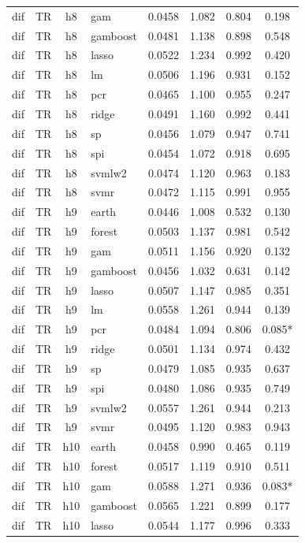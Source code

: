 \begin{ThreePartTable}
\begin{longtable}[t]{llclcccc}
dif & TR & h8 & gam & 0.0458 & 1.082 & 0.804 & 0.198\\
dif & TR & h8 & gamboost & 0.0481 & 1.138 & 0.898 & 0.548\\
dif & TR & h8 & lasso & 0.0522 & 1.234 & 0.992 & 0.420\\
dif & TR & h8 & lm & 0.0506 & 1.196 & 0.931 & 0.152\\
dif & TR & h8 & pcr & 0.0465 & 1.100 & 0.955 & 0.247\\
dif & TR & h8 & ridge & 0.0491 & 1.160 & 0.992 & 0.441\\
dif & TR & h8 & sp & 0.0456 & 1.079 & 0.947 & 0.741\\
dif & TR & h8 & spi & 0.0454 & 1.072 & 0.918 & 0.695\\
dif & TR & h8 & svmlw2 & 0.0474 & 1.120 & 0.963 & 0.183\\
dif & TR & h8 & svmr & 0.0472 & 1.115 & 0.991 & 0.955\\
\addlinespace
dif & TR & h9 & earth & 0.0446 & 1.008 & 0.532 & 0.130\\
dif & TR & h9 & forest & 0.0503 & 1.137 & 0.981 & 0.542\\
dif & TR & h9 & gam & 0.0511 & 1.156 & 0.920 & 0.132\\
dif & TR & h9 & gamboost & 0.0456 & 1.032 & 0.631 & 0.142\\
dif & TR & h9 & lasso & 0.0507 & 1.147 & 0.985 & 0.351\\
dif & TR & h9 & lm & 0.0558 & 1.261 & 0.944 & 0.139\\
dif & TR & h9 & pcr & 0.0484 & 1.094 & 0.806 & 0.085*\\
dif & TR & h9 & ridge & 0.0501 & 1.134 & 0.974 & 0.432\\
dif & TR & h9 & sp & 0.0479 & 1.085 & 0.935 & 0.637\\
dif & TR & h9 & spi & 0.0480 & 1.086 & 0.935 & 0.749\\
dif & TR & h9 & svmlw2 & 0.0557 & 1.261 & 0.944 & 0.213\\
dif & TR & h9 & svmr & 0.0495 & 1.120 & 0.983 & 0.943\\
\addlinespace
dif & TR & h10 & earth & 0.0458 & 0.990 & 0.465 & 0.119\\
dif & TR & h10 & forest & 0.0517 & 1.119 & 0.910 & 0.511\\
dif & TR & h10 & gam & 0.0588 & 1.271 & 0.936 & 0.083*\\
dif & TR & h10 & gamboost & 0.0565 & 1.221 & 0.899 & 0.177\\
dif & TR & h10 & lasso & 0.0544 & 1.177 & 0.996 & 0.333\\

\end{longtable}
\end{ThreePartTable}
